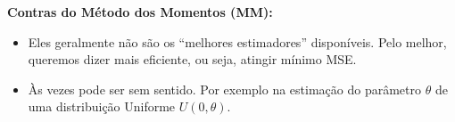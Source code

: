 \textbf{Contras do Método dos Momentos (MM):}

\begin{itemize}
\item Eles geralmente não são os “melhores estimadores” disponíveis. Pelo melhor, queremos dizer mais eficiente, ou seja, atingir mínimo MSE.
\item Às vezes pode ser sem sentido. Por exemplo na estimação do parâmetro \begin{math} \theta \end{math} de uma distribuição Uniforme \begin{math}
U(0,\theta) \end{math}.
\end{itemize}









